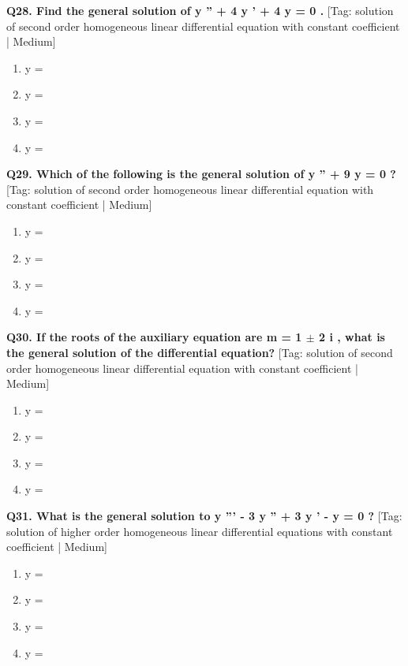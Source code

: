 \noindent\textbf{Q28. Find the general solution of y '' + 4 y ' + 4 y = 0 .} \hfill [Tag: solution of second order homogeneous linear differential equation with constant coefficient | Medium]
\begin{enumerate}[label=(\alph*),topsep=2pt,itemsep=1pt,partopsep=0pt,parsep=0pt]
    \item {{y =}}
    \item {{y =}}
    \item {{y =}}
    \item {{y =}}
\end{enumerate}
\vspace{2mm}

\noindent\textbf{Q29. Which of the following is the general solution of y '' + 9 y = 0 ?} \hfill [Tag: solution of second order homogeneous linear differential equation with constant coefficient | Medium]
\begin{enumerate}[label=(\alph*),topsep=2pt,itemsep=1pt,partopsep=0pt,parsep=0pt]
    \item {{y =}}
    \item {{y =}}
    \item {{y =}}
    \item {{y =}}
\end{enumerate}
\vspace{2mm}

\noindent\textbf{Q30. If the roots of the auxiliary equation are m = 1 $\pm$ 2 i , what is the general solution of the differential equation?} \hfill [Tag: solution of second order homogeneous linear differential equation with constant coefficient | Medium]
\begin{enumerate}[label=(\alph*),topsep=2pt,itemsep=1pt,partopsep=0pt,parsep=0pt]
    \item {{y =}}
    \item {{y =}}
    \item {{y =}}
    \item {{y =}}
\end{enumerate}
\vspace{2mm}

\noindent\textbf{Q31. What is the general solution to y ''' - 3 y '' + 3 y ' - y = 0 ?} \hfill [Tag: solution of higher order homogeneous linear differential equations with constant coefficient | Medium]
\begin{enumerate}[label=(\alph*),topsep=2pt,itemsep=1pt,partopsep=0pt,parsep=0pt]
    \item {{y =}}
    \item {{y =}}
    \item {{y =}}
    \item {{y =}}
\end{enumerate}
\vspace{2mm}


